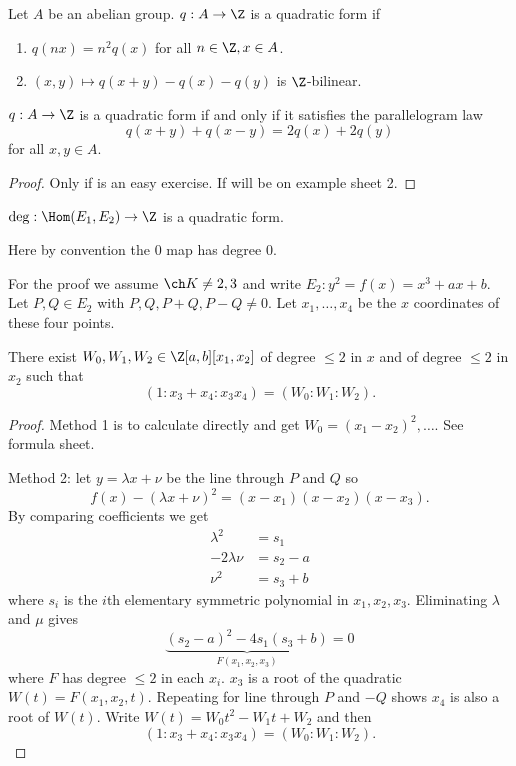 \documentclass[a4paper]{article}
\theoremstyle{definition}
\begin{document}
\begin{definition}
  Let \(A\) be an abelian group. \(q: A \to \Z\) is a quadratic form if
  \begin{enumerate}
  \item \(q(nx) = n^2 q(x)\) for all \(n \in \Z, x \in A\).
  \item \((x, y) \mapsto q(x + y) - q(x) - q(y)\) is \(\Z\)-bilinear.
  \end{enumerate}
\end{definition}

\begin{lemma}
  \(q: A \to \Z\) is a quadratic form if and only if it satisfies the parallelogram law
  \[
    q(x + y) + q(x - y) = 2q(x) + 2q(y)
  \]
  for all \(x, y \in A\).
\end{lemma}

\begin{proof}
  Only if is an easy exercise. If will be on example sheet 2.
\end{proof}

\begin{theorem}
  \(\deg: \Hom(E_1, E_2) \to \Z\) is a quadratic form.
\end{theorem}
Here by convention the 0 map has degree \(0\).

For the proof we assume \(\ch K \neq 2, 3\) and write \(E_2: y^2 = f(x) = x^3 + ax + b\). Let \(P, Q \in E_2\) with \(P, Q, P + Q, P - Q \neq 0\). Let \(x_1, \dots, x_4\) be the \(x\) coordinates of these four points.

\begin{lemma}
  There exist \(W_0, W_1, W_2 \in \Z[a, b][x_1, x_2]\) of degree \(\leq 2\) in \(x\) and of degree \(\leq 2\) in \(x_2\) such that
  \[
    (1: x_3 + x_4: x_3x_4) = (W_0: W_1: W_2).
  \]
\end{lemma}

\begin{proof}
  Method 1 is to calculate directly and get \(W_0 = (x_1 - x_2)^2, \dots\). See formula sheet.

  Method 2: let \(y = \lambda x + \nu\) be the line through \(P\) and \(Q\) so
  \[
    f(x) - (\lambda x + \nu)^2 = (x - x_1)(x - x_2)(x - x_3).
  \]
  By comparing coefficients we get
  \begin{align*}
    \lambda^2 &= s_1 \\
    -2 \lambda \nu &= s_2 - a \\
    \nu^2 &= s_3 + b
  \end{align*}
  where \(s_i\) is the \(i\)th elementary symmetric polynomial in \(x_1, x_2, x_3\). Eliminating \(\lambda\) and \(\mu\) gives
  \[
    \underbrace{(s_2 - a)^2 - 4s_1 (s_3 + b)}_{F(x_1, x_2, x_3)} = 0
  \]
  where \(F\) has degree \(\leq 2\) in each \(x_i\). \(x_3\) is a root of the quadratic \(W(t) = F(x_1, x_2, t)\). Repeating for line through \(P\) and \(-Q\) shows \(x_4\) is also a root of \(W(t)\). Write \(W(t) = W_0t^2 - W_1t + W_2\) and then
  \[
    (1: x_3 + x_4: x_3x_4) = (W_0: W_1: W_2).
  \]
\end{proof}
\end{document}
